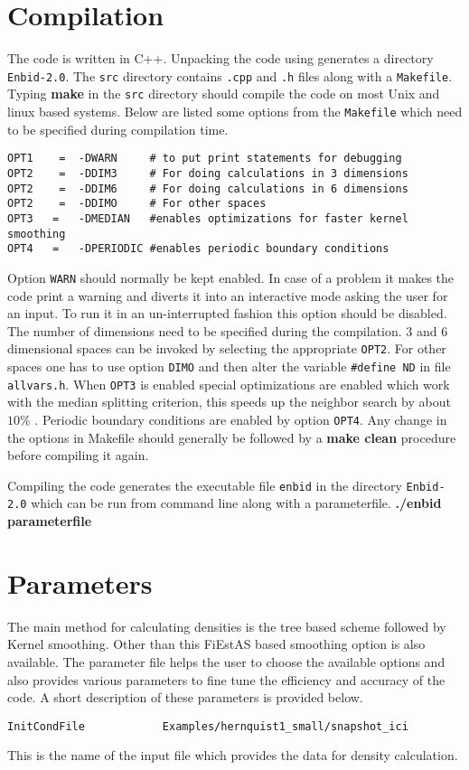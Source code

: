 \documentclass{article}
\begin{document}
\section{Compilation}
The code is written in C++. Unpacking the code
using  \newline generates a 
directory \verb$Enbid-2.0$. The \verb$src$ directory 
contains \verb$.cpp$ and \verb$.h$ files
along with a \verb$Makefile$. Typing {\bf make} in the \verb$src$
directory should compile the code on most Unix and linux based systems.
Below are listed some options from the \verb$Makefile$
which need to be specified during compilation time.
\begin{verbatim}
OPT1    =  -DWARN     # to put print statements for debugging
OPT2    =  -DDIM3     # For doing calculations in 3 dimensions
OPT2    =  -DDIM6     # For doing calculations in 6 dimensions
OPT2    =  -DDIMO     # For other spaces 
OPT3   =   -DMEDIAN   #enables optimizations for faster kernel smoothing
OPT4   =   -DPERIODIC #enables periodic boundary conditions
\end{verbatim}
Option \verb$WARN$ should normally be kept enabled. In case of a problem
it makes the code print a warning and diverts it into an interactive mode 
asking the user for an input.  To run it in an un-interrupted fashion 
this option should be disabled.
The number of dimensions need to be specified during the compilation. $3$ and
$6$ dimensional spaces  can be invoked by selecting the appropriate
\verb$OPT2$. For other spaces one
has to use option \verb$DIMO$ and then alter the variable
\verb$#define ND$ in file \verb$allvars.h$.  When \verb$OPT3$ is 
enabled special optimizations are enabled which  work with the median
splitting criterion, this speeds up the neighbor search by about $10\%$ .
Periodic boundary conditions are enabled by option \verb$OPT4$.
Any change in the options in Makefile should generally be followed by
a {\bf make clean} procedure before compiling it again.

Compiling the code generates the executable file \verb$enbid$
in the directory \verb$Enbid-2.0$ which can be run from command line along with a parameterfile. \newline
{\bf ./enbid parameterfile}\newline

\section{Parameters}
The main method for calculating densities is the 
tree based scheme followed by Kernel  smoothing. 
Other than this FiEstAS based smoothing option 
is also available. The parameter file 
helps the user to choose the available options and also
provides various parameters to fine tune the efficiency 
and accuracy of the code. 
A short description of these parameters is provided below.
\begin{verbatim}
InitCondFile            Examples/hernquist1_small/snapshot_ici
\end{verbatim}
This is the name of the input file which provides
the data for density calculation.
\end{document}
